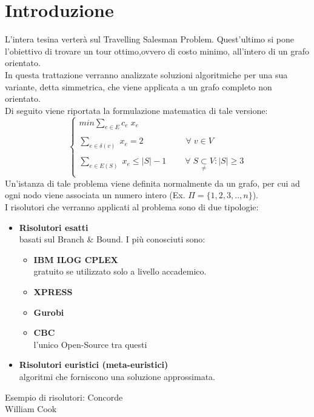 \chapter{Introduzione}
L'intera tesina verterà sul Travelling Salesman Problem. Quest'ultimo si pone l'obiettivo di trovare un tour ottimo,ovvero di costo minimo, all'intero di un grafo orientato.\\
In questa trattazione verranno analizzate soluzioni algoritmiche per una sua variante, detta simmetrica, che viene applicata a un grafo completo non orientato.\\ Di seguito viene riportata la formulazione matematica di tale versione:
$$
\begin{cases}
min \underset{e\in E}\sum{c_e\;x_e} \\\\
\underset{e\in \delta(v)}\sum{\;x_e} = 2\;\;\;\;\;\;\;\;\;\;\;\;\;\;\;\;\;\;\forall\;v\in V \\\\
\underset{e\in E(S)}\sum{\;x_e} \leq \vert S\vert - 1\;\;\;\;\;\;\;\;\forall\;S\underset{\neq} \subset V: \vert S\vert\geq 3\\
\end{cases}
$$
Un'istanza di tale problema viene definita normalmente da un grafo, per cui ad ogni nodo viene associata un numero intero (Ex. $\Pi = \{1,2,3,..,n\}$). \\
I risolutori che verranno applicati al problema sono di due tipologie:
\begin{itemize}
\item{\textbf{Risolutori esatti}\\ basati sul Branch \& Bound. I più conosciuti sono:
\begin{itemize}
\item{\textbf{IBM ILOG CPLEX}\\
gratuito se utilizzato solo a livello accademico.}
\item{\textbf{XPRESS}}
\item{\textbf{Gurobi}}
\item{\textbf{CBC}\\
l'unico Open-Source tra questi}
\end{itemize}
}
\item{\textbf{Risolutori euristici (meta-euristici)}\\
algoritmi che forniscono una soluzione approssimata.}
\end{itemize}
Esempio di risolutori: Concorde \cite{concorde}\\
William Cook \cite{cook}\\